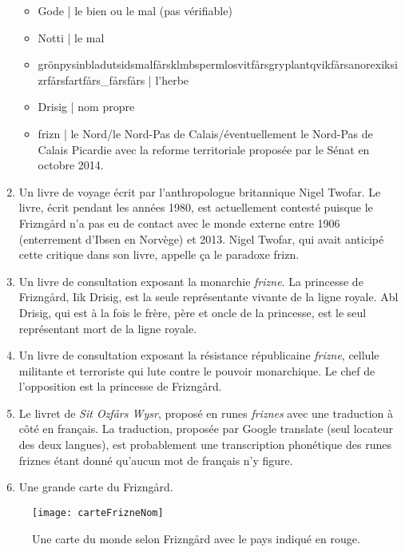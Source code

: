 \begin{enumerate}
\begin{itemize}
  \item Gode | le bien ou le mal (pas vérifiable)
  \item Notti | le mal
  \item grön\-pysin\-blad\-utsid\-smal\-fårs\-klmb\-sperm\-lo\-svit\-fårs\-gry\-plant\-qvik\-fårs\-anorexik\-sizr\-fårs\-fart\-fårs\-\_\-fårs\-fårs
  | l'herbe
  \item Drisig | nom propre
  \item frizn | le Nord/le Nord-Pas de Calais/éventuellement le Nord-Pas de
  Calais Picardie avec la reforme territoriale proposée par le Sénat en
  octobre 2014.
  \end{itemize}
\item Un livre de voyage écrit par l'anthropologue britannique Nigel Twofar.
Le livre, écrit pendant les années 1980, est actuellement contesté
puisque le Frizngård n'a pas eu de contact avec le monde externe entre 1906
(enterrement d'Ibsen en Norvège) et 2013. Nigel Twofar, qui avait anticipé
cette critique dans son livre, appelle ça le \og{}paradoxe frizn\fg{}.
\item Un livre de consultation exposant la monarchie \emph{frizne}. La
princesse de Frizngård, Iik Drisig, est la seule représentante vivante de la ligne
royale. Abl Drisig, qui est à la fois le frère, père et oncle de la princesse, est le seul
représentant mort de la ligne royale.
\item Un livre de consultation exposant la résistance républicaine
\emph{frizne}, cellule militante et terroriste qui lute contre le pouvoir
monarchique. Le chef de l'opposition est la princesse de Frizngård.
\item Le livret de \emph{Sit Ozfårs Wysr}, proposé en runes \emph{friznes}
avec une traduction à côté en français. La traduction, proposée par Google
translate (seul locateur des deux langues), est probablement une
transcription phonétique des runes friznes étant donné qu'aucun mot de
français n'y figure.
\item Une grande carte du Frizngård.
\end{enumerate}
\begin{figure}
\texttt{[image: carteFrizneNom]}
\caption{Une carte du monde selon Frizngård avec le pays indiqué en rouge.}
\end{figure}
